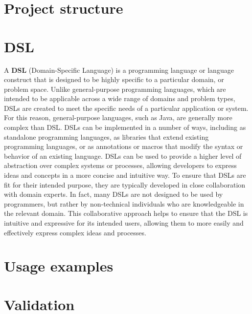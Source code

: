 \section{Project structure}\label{section:project_structure}

\section{DSL}\label{section:dsl}
A \textbf{DSL} (Domain-Specific Language) \cite{dsl_definition} is a programming language or language construct that is designed to be highly specific to a particular domain, or problem space. Unlike general-purpose programming languages, which are intended to be applicable across a wide range of domains and problem types, DSLs are created to meet the specific needs of a particular application or system. For this reason, general-purpose languages, such as Java, are generally more complex than DSL.\newline 
DSLs can be implemented in a number of ways, including as standalone programming languages, as libraries that extend existing programming languages, or as annotations or macros that modify the syntax or behavior of an existing language. DSLs can be used to provide a higher level of abstraction over complex systems or processes, allowing developers to express ideas and concepts in a more concise and intuitive way.\newline
To ensure that DSLs are fit for their intended purpose, they are typically developed in close collaboration with domain experts. In fact, many DSLs are not designed to be used by programmers, but rather by non-technical individuals who are knowledgeable in the relevant domain. This collaborative approach helps to ensure that the DSL is intuitive and expressive for its intended users, allowing them to more easily and effectively express complex ideas and processes.

\section{Usage examples}\label{section:usage_example}

\section{Validation}\label{section:validation}
